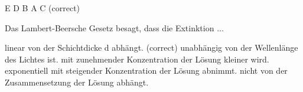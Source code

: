 \documentclass[11pt]{exam}
\begin{document}
\begin{questions}
\begin{choices}
	\choice E
	\choice D
	\choice B
	\choice A
	\choice C (correct)
\end{choices}

\vspace{3mm}\question Das Lambert-Beersche Gesetz besagt, dass die Extinktion ...

\begin{choices}
	\choice linear von der Schichtdicke d abhängt. (correct)
	\choice unabhängig von der Wellenlänge des Lichtes ist.
	\choice mit zunehmender Konzentration der Lösung kleiner wird.
	\choice exponentiell mit steigender Konzentration der Lösung abnimmt.
	\choice nicht von der Zusammensetzung der Lösung abhängt.
\end{choices}

\vspace{3mm}\end{questions}
\end{document}
